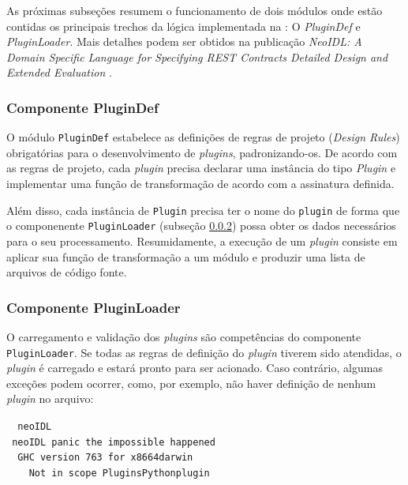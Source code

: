 As próximas subseções resumem o funcionamento de
dois módulos onde estão contidas os principais trechos da lógica implementada na \neoidl{}: O
\textit{PluginDef} e \textit{PluginLoader}. Mais detalhes podem ser obtidos na
publicação \textit{NeoIDL: A Domain Specific Language for Specifying REST
Contracts Detailed Design and Extended Evaluation} \cite{lima2015neoidl}.


\subsubsection{Componente PluginDef}{\label{sec:plugindef}}

O módulo \texttt{PluginDef} estabelece as definições de regras de projeto
(\textit{Design Rules}) obrigatórias para o desenvolvimento de
\textit{plugins}, padronizando-os. De acordo com as regras de projeto, cada
\textit{plugin} precisa declarar uma instância do tipo \emph{Plugin} e implementar uma função de
transformação de acordo com a assinatura definida.

Além disso, cada instância de  
\texttt{Plugin} precisa ter o nome do \texttt{plugin} de forma que o
componenente \texttt{PluginLoader} (subseção \ref{compPluginLoader}) possa obter
os dados necessários para o seu processamento.
Resumidamente, a execução de um \textit{plugin} consiste em aplicar sua função
de transformação a um módulo \neoidl{} e produzir uma lista de
arquivos de código fonte. 


\subsubsection{Componente PluginLoader}
\label{compPluginLoader}

O carregamento e validação dos \textit{plugins} são competências do componente
\texttt{PluginLoader}. Se todas as regras de definição do \textit{plugin}
tiverem sido atendidas, o \textit{plugin} é carregado e estará pronto para ser
 acionado. Caso contrário, algumas exceções podem ocorrer, como, por exemplo, não haver definição de
nenhum \textit{plugin} no arquivo:

\begin{tabbing}\tt
~neoIDL\\
\tt ~neoIDL~panic~the~impossible~happened\\
\tt ~~GHC~version~763~for~x8664darwin\\
\tt ~~~~Not~in~scope~PluginsPythonplugin
\end{tabbing}

